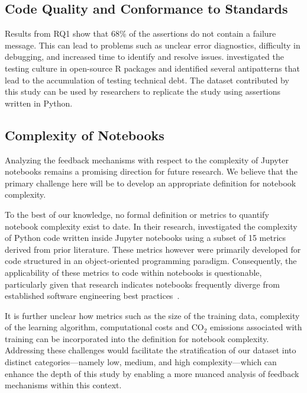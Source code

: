 \documentclass[journal]{IEEEtran}       %
\begin{document}
\subsection{Code Quality and Conformance to Standards}

Results from RQ1 show that 68\% of the assertions do not contain a
failure message. This can lead to problems such as unclear error
diagnostics, difficulty in debugging, and increased time to identify
and resolve issues. \cite{vidoni2021evaluating} investigated the
testing culture in open-source R packages and identified several
antipatterns that lead to the accumulation of testing technical debt.
The dataset contributed by this study can be used by researchers to
replicate the \cite{vidoni2021evaluating} study using assertions
written in Python.

\subsection{Complexity of Notebooks}

Analyzing the feedback mechanisms with respect to the complexity of
Jupyter notebooks remains a promising direction for future research.
We believe that the primary challenge here will be to develop an
appropriate definition for notebook complexity.

To the best of our knowledge, no formal definition or metrics to
quantify notebook complexity exist to date. In their research,
\cite{grotov2022large-scale} investigated the complexity of Python
code written inside Jupyter notebooks using a subset of 15 metrics
derived from prior literature. These metrics however were primarily
developed for code structured in an object-oriented programming
paradigm. Consequently, the applicability of these metrics to code
within notebooks is questionable, particularly given that research
indicates notebooks frequently diverge from established software
engineering best practices~\cite{pimentel2019large-scale}.

It is further unclear how metrics such as the size of the training
data, complexity of the learning algorithm, computational costs and
CO\(_2\) emissions associated with training can be incorporated into
the definition for notebook complexity. Addressing these challenges
would facilitate the stratification of our dataset into distinct
categories---namely low, medium, and high complexity---which can
enhance the depth of this study by enabling a more nuanced analysis
of feedback mechanisms within this context.
\end{document}

